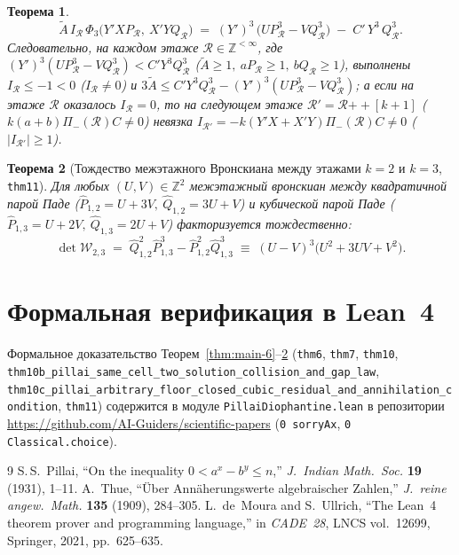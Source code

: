 \documentclass[11pt,a4paper]{article}
\theoremstyle{plain}
\newtheorem{theorem}{Теорема}[section]
\theoremstyle{definition}
\begin{document}
\begin{theorem}
\[
  \widetilde{A}\,I_{\mathcal{R}}\,\Phi_3\bigl(Y'X P_{\mathcal{R}},\ X'Y Q_{\mathcal{R}}\bigr)
  \;=\; (Y')^3\,\bigl(U P_{\mathcal{R}}^3 - V Q_{\mathcal{R}}^3\bigr) \;-\; C'\,Y^3\,Q_{\mathcal{R}}^3.
\]
Следовательно, на каждом этаже $\mathcal{R}\in\mathbb{Z}^{<\infty}$, где $(Y')^3(U P_{\mathcal{R}}^3 - V Q_{\mathcal{R}}^3) < C' Y^3 Q_{\mathcal{R}}^3$ ($\widetilde{A}\ge 1,\ a P_{\mathcal{R}}\ge 1,\ b Q_{\mathcal{R}}\ge 1$), выполнены $I_{\mathcal{R}} \le -1 < 0$ ($I_{\mathcal{R}}\ne 0$) и $3\widetilde{A} \le C' Y^3 Q_{\mathcal{R}}^3 - (Y')^3(U P_{\mathcal{R}}^3 - V Q_{\mathcal{R}}^3)$; а если на этаже $\mathcal{R}$ оказалось $I_{\mathcal{R}} = 0$, то на следующем этаже $\mathcal{R}' = \mathcal{R}\mathbin{+\!+}[k+1]$ ($k(a+b)\Pi_-(\mathcal{R})C \ne 0$) невязка $I_{\mathcal{R}'} = -k(Y'X + X'Y)\Pi_-(\mathcal{R})C \ne 0$ ($|I_{\mathcal{R}'}|\ge 1$).
\end{theorem}

\begin{theorem}[Тождество межэтажного Вронскиана между этажами $k=2$ и $k=3$, \texttt{thm11}]
\label{thm:main-11}
Для любых $(U,V)\in\mathbb{Z}^2$ межэтажный вронскиан между квадратичной парой Паде ($\widehat{P}_{1,2}=U+3V,\ \widehat{Q}_{1,2}=3U+V$) и кубической парой Паде ($\widehat{P}_{1,3}=U+2V,\ \widehat{Q}_{1,3}=2U+V$) факторизуется тождественно:
\begin{equation}
  \label{eq:cross-floor-wronskian}
  \det\mathcal{W}_{2,3} \;=\; \widehat{Q}_{1,2}^2\widehat{P}_{1,3}^3 - \widehat{P}_{1,2}^2\widehat{Q}_{1,3}^3 \;\equiv\; (U - V)^3\bigl(U^2 + 3UV + V^2\bigr).
\end{equation}
\end{theorem}

\section{Формальная верификация в Lean~4}
Формальное доказательство Теорем~\ref{thm:main-6}--\ref{thm:main-11} (\texttt{thm6}, \texttt{thm7}, \texttt{thm10}, \texttt{thm10b\_pillai\_same\_cell\_two\_solution\_collision\_and\_gap\_law}, \texttt{thm10c\_pillai\_arbitrary\_floor\_closed\_cubic\_residual\_and\_annihilation\_condition}, \texttt{thm11}) содержится в модуле \texttt{PillaiDiophantine.lean} в репозитории \url{https://github.com/AI-Guiders/scientific-papers} (\texttt{0 sorryAx}, \texttt{0 Classical.choice}).

\begin{thebibliography}{9}
S.\,S.~Pillai, ``On the inequality $0 < a^x - b^y \le n$,'' \emph{J.~Indian Math.~Soc.} \textbf{19} (1931), 1--11.
A.~Thue, ``\"Uber Ann\"aherungswerte algebraischer Zahlen,'' \emph{J.~reine angew.~Math.} \textbf{135} (1909), 284--305.
L.~de~Moura and S.~Ullrich, ``The Lean~4 theorem prover and programming language,'' in \emph{CADE~28}, LNCS vol.~12699, Springer, 2021, pp.~625--635.
\end{thebibliography}
\end{document}
